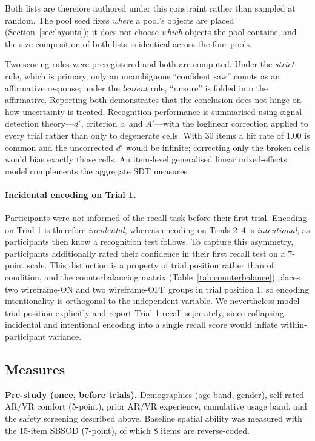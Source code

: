 Both lists are therefore authored under this constraint rather than sampled at
random. The pool seed fixes \emph{where} a pool's objects are placed
(Section~\ref{sec:layouts}); it does not choose \emph{which} objects the pool
contains, and the size composition of both lists is identical across the four
pools.

Two scoring rules were preregistered and both are computed. Under the
\emph{strict} rule, which is primary, only an unambiguous ``confident saw''
counts as an affirmative response; under the \emph{lenient} rule, ``unsure''
is folded into the affirmative. Reporting both demonstrates that the
conclusion does not hinge on how uncertainty is treated. Recognition
performance is summarised using signal detection theory---$d'$, criterion $c$,
and $A'$---with the loglinear correction \cite{hautus_corrections_1995}
applied to every trial rather than only to degenerate cells. With 30 items a
hit rate of 1.00 is common and the uncorrected $d'$ would be infinite;
correcting only the broken cells would bias exactly those cells. An item-level
generalised linear mixed-effects model complements the aggregate SDT measures.

\paragraph{Incidental encoding on Trial 1.} Participants were not informed of
the recall task before their first trial. Encoding on Trial 1 is therefore
\emph{incidental}, whereas encoding on Trials 2--4 is \emph{intentional}, as
participants then know a recognition test follows. To capture this asymmetry,
participants additionally rated their confidence in their first recall test on
a 7-point scale. This distinction is a property of trial position rather than
of condition, and the counterbalancing matrix
(Table~\ref{tab:counterbalance}) places two wireframe-ON and two wireframe-OFF
groups in trial position 1, so encoding intentionality is orthogonal to the
independent variable. We nevertheless model trial position explicitly and
report Trial 1 recall separately, since collapsing incidental and intentional
encoding into a single recall score would inflate within-participant variance.

\subsection{Measures}

\textbf{Pre-study (once, before trials).} Demographics (age band, gender),
self-rated AR/VR comfort (5-point), prior AR/VR experience, cumulative usage
band, and the safety screening described above. Baseline spatial ability was
measured with the 15-item SBSOD (7-point), of which 8 items are reverse-coded.

